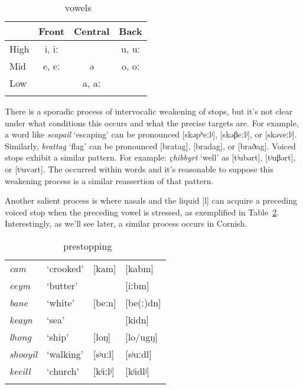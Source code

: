 \documentclass[output=paper,colorlinks,citecolor=brown]{langscibook}
\begin{document}
\begin{table}
\caption{\ma\ vowels}
\label{ma.vowels.tab}
\begin{tabular}[t]{lccc}
\lsptoprule
         & Front & Central & Back \\
\midrule
High     & i, iː &         & u, uː \\
Mid      & e, eː & ə       & o, oː \\
Low      &       & a, aː   & \\
\lspbottomrule
\end{tabular}
\end{table}

There is a sporadic process of intervocalic weakening of stops, but it's not clear under what conditions this occurs and what the precise targets are. For example, a word like \emph{scapail} `escaping' can be pronounced [skəpʰeːlʲ], [skəβeːlʲ], or [skəveːlʲ]. Similarly, \emph{brattag} `flag' can be pronounced [bratag], [bradag], or [braðag]. Voiced stops exhibit a similar pattern. For example: \emph{\c chibbyrt} `well' as [tʲubərt], [tʲuβərt], or [tʲuvərt].  The  \m{} occurred  within words and it's reasonable to suppose this weakening process is a similar reassertion of that pattern.

Another salient process is  where nasals and the liquid [l] can acquire a preceding voiced stop when the preceding vowel is stressed, as exemplified in Table~\ref{ma.prestopping.tab}. Interestingly, as we'll see later, a similar process occurs in Cornish.

\begin{table}
\caption{\ma\ prestopping}
\label{ma.prestopping.tab}
\begin{tabular}[t]{llll}
\lsptoprule
\itshape cam    & `crooked'  & [kam]    & [kabm] \\
\itshape eeym   & `butter'   &          & [iːbm] \\
\itshape bane   & `white'    & [beːn]   & [be(ː)dn] \\
\itshape keayn  & `sea'      &          & [kidn] \\
\itshape lhong  & `ship'     & [loŋ]    & [lo/ugŋ] \\
\itshape shooyil & `walking' & [sʲuːl]  & [sʲuːdl] \\
\itshape keeill & `church'   & [kʲiːlʲ] & [kʲidlʲ] \\
\lspbottomrule
\end{tabular}
\end{table}
\end{document}
